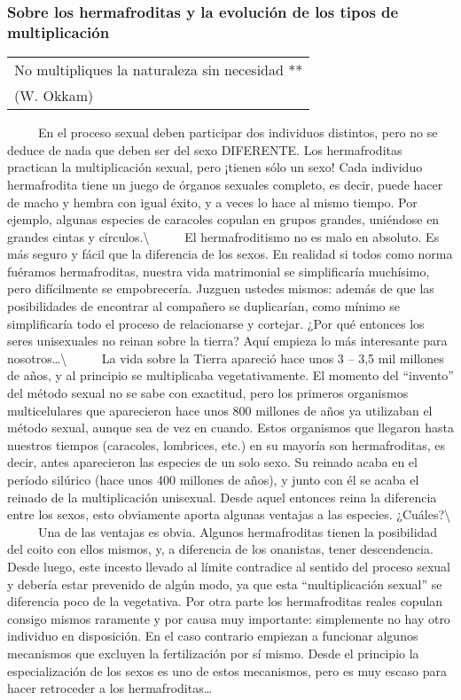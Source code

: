 \subsubsection{Sobre los hermafroditas y la evolución de los tipos de
multiplicación}\label{sobre-los-hermafroditas-y-la-evoluciuxf3n-de-los-tipos-de-multiplicaciuxf3n}

\begin{longtable}[]{@{}l@{}}
\toprule
No multipliques la naturaleza sin necesidad **\tabularnewline
(W. Okkam)\tabularnewline
\bottomrule
\end{longtable}

~ ~ ~ En el proceso sexual deben participar dos individuos distintos,
pero no se deduce de nada que deben ser del sexo DIFERENTE. Los
hermafroditas practican la multiplicación sexual, pero ¡tienen sólo un
sexo! Cada individuo hermafrodita tiene un juego de órganos sexuales
completo, es decir, puede hacer de macho y hembra con igual éxito, y a
veces lo hace al mismo tiempo. Por ejemplo, algunas especies de
caracoles copulan en grupos grandes, uniéndose en grandes cintas y
círculos.\textbackslash{} ~ ~ ~ El hermafroditismo no es malo en
absoluto. Es más seguro y fácil que la diferencia de los sexos. En
realidad si todos como norma fuéramos hermafroditas, nuestra vida
matrimonial se simplificaría muchísimo, pero difícilmente se
empobrecería. Juzguen ustedes mismos: además de que las posibilidades de
encontrar al compañero se duplicarían, como mínimo se simplificaría todo
el proceso de relacionarse y cortejar. ¿Por qué entonces los seres
unisexuales no reinan sobre la tierra? Aquí empieza lo más interesante
para nosotros\ldots{}\textbackslash{} ~ ~ ~ La vida sobre la Tierra
apareció hace unos 3 -- 3,5 mil millones de años, y al principio se
multiplicaba vegetativamente. El momento del ``invento'' del método
sexual no se sabe con exactitud, pero los primeros organismos
multicelulares que aparecieron hace unos 800 millones de años ya
utilizaban el método sexual, aunque sea de vez en cuando. Estos
organismos que llegaron hasta nuestros tiempos (caracoles, lombrices,
etc.) en su mayoría son hermafroditas, es decir, antes aparecieron las
especies de un solo sexo. Su reinado acaba en el período silúrico (hace
unos 400 millones de años), y junto con él se acaba el reinado de la
multiplicación unisexual. Desde aquel entonces reina la diferencia entre
los sexos, esto obviamente aporta algunas ventajas a las especies.
¿Cuáles?\textbackslash{} ~ ~ ~ Una de las ventajas es obvia. Algunos
hermafroditas tienen la posibilidad del coito con ellos mismos, y, a
diferencia de los onanistas, tener descendencia. Desde luego, este
incesto llevado al límite contradice al sentido del proceso sexual y
debería estar prevenido de algún modo, ya que esta ``multiplicación
sexual'' se diferencia poco de la vegetativa. Por otra parte los
hermafroditas reales copulan consigo mismos raramente y por causa muy
importante: simplemente no hay otro individuo en disposición. En el caso
contrario empiezan a funcionar algunos mecanismos que excluyen la
fertilización por sí mismo. Desde el principio la especialización de los
sexos es uno de estos mecanismos, pero es muy escaso para hacer
retroceder a los hermafroditas\ldots{}

